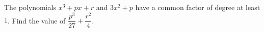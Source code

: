 The polynomials $x^3+px+r$ and $3x^2+p$ have a common factor of degree at least $1$. Find the value of $\dfrac{p^3}{27}+\dfrac{r^2}{4}$.
